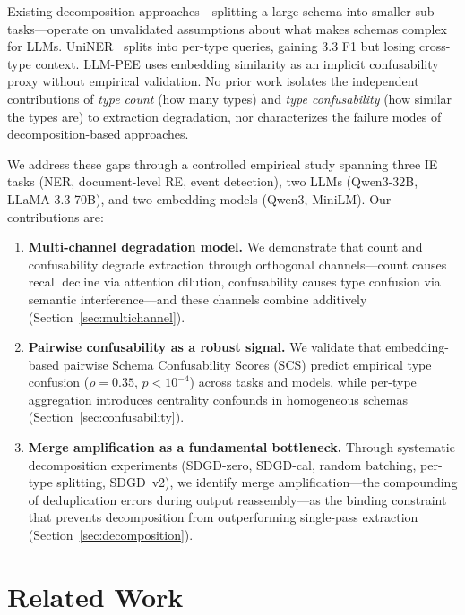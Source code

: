 \documentclass[11pt,a4paper]{article}
\begin{document}
Existing decomposition approaches---splitting a large schema into smaller sub-tasks---operate on unvalidated assumptions about what makes schemas complex for LLMs. UniNER~\citep{universal-ner} splits into per-type queries, gaining 3.3 F1 but losing cross-type context. LLM-PEE uses embedding similarity as an implicit confusability proxy without empirical validation. No prior work isolates the independent contributions of \emph{type count} (how many types) and \emph{type confusability} (how similar the types are) to extraction degradation, nor characterizes the failure modes of decomposition-based approaches.

We address these gaps through a controlled empirical study spanning three IE tasks (NER, document-level RE, event detection), two LLMs (Qwen3-32B, LLaMA-3.3-70B), and two embedding models (Qwen3, MiniLM). Our contributions are:

\begin{enumerate}
    \item \textbf{Multi-channel degradation model.} We demonstrate that count and confusability degrade extraction through orthogonal channels---count causes recall decline via attention dilution, confusability causes type confusion via semantic interference---and these channels combine additively (Section~\ref{sec:multichannel}).

    \item \textbf{Pairwise confusability as a robust signal.} We validate that embedding-based pairwise Schema Confusability Scores (SCS) predict empirical type confusion ($\rho=0.35$, $p<10^{-4}$) across tasks and models, while per-type aggregation introduces centrality confounds in homogeneous schemas (Section~\ref{sec:confusability}).

    \item \textbf{Merge amplification as a fundamental bottleneck.} Through systematic decomposition experiments (SDGD-zero, SDGD-cal, random batching, per-type splitting, SDGD~v2), we identify merge amplification---the compounding of deduplication errors during output reassembly---as the binding constraint that prevents decomposition from outperforming single-pass extraction (Section~\ref{sec:decomposition}).
\end{enumerate}

\section{Related Work}
\end{document}
